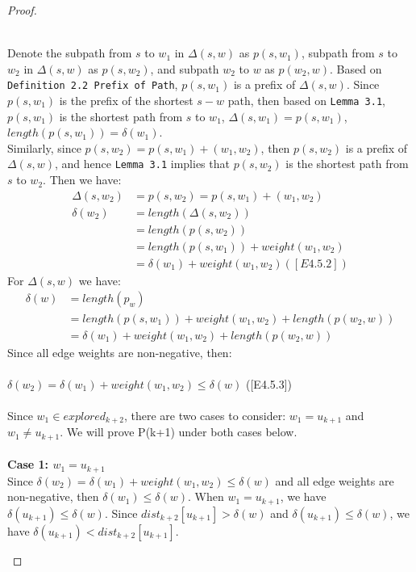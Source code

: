 \begin{proof}
\begin{itemize}
\begin{enumerate}
\begin{center}
  \end{center}
  \tab\\
  Denote the subpath from $s$ to $w_1$ in $\Delta(s, w)$ as $p(s, w_1)$, subpath from $s$ to $w_2$ in $\Delta(s, w)$ as $p(s, w_2)$, and subpath $w_2$ to $w$ as $p(w_2, w)$. Based on \texttt{Definition 2.2 Prefix of Path}, $p(s, w_1)$ is a prefix of $\Delta(s, w)$. Since $p(s, w_1)$ is the prefix of the shortest $s-w$ path, then based on \texttt{Lemma 3.1}, $p(s, w_1)$ is the shortest path from $s$ to $w_1$, $\Delta(s, w_1) = p(s, w_1)$, $length(p(s, w_1)) = \delta(w_1)$. 
  \\
  Similarly, since $p(s, w_2) = p(s, w_1) + (w_1, w_2)$, then $p(s, w_2)$ is a prefix of $\Delta(s, w)$, and hence \texttt{Lemma 3.1} implies that $p(s, w_2)$ is the shortest path from $s$ to $w_2$. Then we have: 
  \begin{align*} 
      \Delta(s, w_2) &= p(s, w_2) = p(s, w_1) + (w_1, w_2) \\
      \delta(w_2) &= length(\Delta(s, w_2)) \\
                  &= length(p(s, w_2)) \\
                  &= length(p(s, w_1)) + weight(w_1, w_2)\\
                  &= \delta(w_1) + weight(w_1, w_2) ([E4.5.2])
  \end{align*}
  For $\Delta(s, w)$ we have: 
  \begin{align*}
    \delta(w) &= length(p_w) \\
              &= length(p(s, w_1)) + weight(w_1, w_2) + length(p(w_2, w)) \\
              &= \delta(w_1) + weight(w_1, w_2) + length(p(w_2, w))
  \end{align*}
  Since all edge weights are non-negative, then: 
  \\\\
    \tab $\delta(w_2) = \delta(w_1) + weight(w_1, w_2) \leq \delta(w)$ ([E4.5.3])
  \\\\
  Since $w_1 \in explored_{k+2}$, there are two cases to consider: $w_1 =u_{k+1}$ and $w_1 \neq u_{k+1}$. We will prove P(k+1) under both cases below. 
  \\\\
  \textbf{Case 1: $w_1 = u_{k+1}$}
  \\
  Since $\delta(w_2) = \delta(w_1) + weight(w_1, w_2) \leq \delta(w)$ and all edge weights are non-negative, then $\delta(w_1) \leq \delta(w)$. When $w_1 = u_{k+1}$, we have $\delta(u_{k+1}) \leq \delta(w)$. Since $dist_{k+2}[u_{k+1}] > \delta(w)$ and $\delta(u_{k+1}) \leq \delta(w)$, we have $\delta(u_{k+1}) < dist_{k+2}[u_{k+1}]$.

\end{enumerate}
\end{itemize}
\end{proof}
